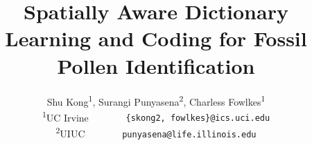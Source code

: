 \documentclass[10pt,twocolumn,letterpaper]{article}
\begin{document}
\title{Spatially Aware Dictionary Learning and Coding for  Fossil Pollen Identification}


\author{Shu Kong\textsuperscript{1}, Surangi Punyasena\textsuperscript{2}, Charless Fowlkes\textsuperscript{1}\\
\textsuperscript{1}UC Irvine  \ \ \ \ \ \ \
{\tt\small \{skong2, fowlkes\}@ics.uci.edu}\\
\textsuperscript{2}UIUC  \ \ \ \ \ \ \
{\tt\small punyasena@life.illinois.edu}
}







\end{document}
